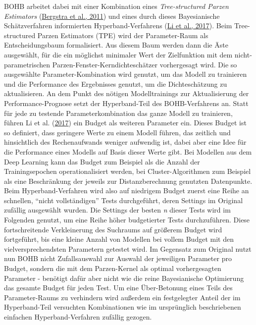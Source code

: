 \documentclass[
  12pt,
  openany]{book}
\begin{document}
BOHB arbeitet dabei mit einer Kombination eines \emph{Tree-structured Parzen Estimators} (\protect\hyperlink{ref-bergstraAlgorithmsHyperParameterOptimization2011}{Bergstra et al., 2011}) und eines durch dieses Bayesianische Schätzverfahren informierten Hyperband-Verfahrens (\protect\hyperlink{ref-liHyperbandBanditbasedConfiguration2017}{Li et al., 2017}). Beim Tree-structured Parzen Estimators (TPE) wird der Parameter-Raum als Entscheidungsbaum formalisiert. Aus diesem Baum werden dann die Äste ausgewählt, für die ein möglichst minimaler Wert der Zielfunktion mit dem nicht-parametrischen Parzen-Fenster-Kerndichteschätzer vorhergesagt wird. Die so ausgewählte Parameter-Kombination wird genutzt, um das Modell zu trainieren und die Performance des Ergebnisses genutzt, um die Dichteschätzung zu aktualisieren.
An dem Punkt des nötigen Modelltrainings zur Aktualisierung der Performance-Prognose setzt der Hyperband-Teil des BOHB-Verfahrens an. Statt für jede zu testende Parameterkombination das ganze Modell zu trainieren, führen Li et al. (\protect\hyperlink{ref-liHyperbandBanditbasedConfiguration2017}{2017}) ein Budget als weiteren Parameter ein. Dieses Budget ist so definiert, dass geringere Werte zu einem Modell führen, das zeitlich und hinsichtlich des Rechenaufwands weniger aufwendig ist, dabei aber eine Idee für die Performance eines Modells auf Basis dieser Werte gibt. Bei Modellen aus dem Deep Learning kann das Budget zum Beispiel als die Anzahl der Trainingsepochen operationalisiert werden, bei Cluster-Algorithmen zum Beispiel als eine Beschränkung der jeweils zur Distanzberechnung genutzten Datenpunkte. Beim Hyperband-Verfahren wird also auf niedrigem Budget zuerst eine Reihe an schnellen, ``nicht vollständigen'' Tests durchgeführt, deren Settings im Original zufällig ausgewählt wurden. Die Settings der besten \emph{n} dieser Tests wird im Folgenden genutzt, um eine Reihe höher budgetierter Tests durchzuführen. Diese fortschreitende Verkleinerung des Suchraums auf größerem Budget wird fortgeführt, bis eine kleine Anzahl von Modellen bei vollem Budget mit den vielversprechendsten Parametern getestet wird.
Im Gegensatz zum Original nutzt nun BOHB nicht Zufallsauswahl zur Auswahl der jeweiligen Parameter pro Budget, sondern die mit dem Parzen-Kernel als optimal vorhergesagten Parameter - benötigt dafür aber nicht wie die reine Bayesianische Optimierung das gesamte Budget für jeden Test.
Um eine Über-Betonung eines Teils des Parameter-Raums zu verhindern wird außerdem ein festgelegter Anteil der im Hyperband-Teil versuchten Kombinationen wie im ursprünglich beschriebenen einfachen Hyperband-Verfahren zufällig gezogen.
\end{document}
